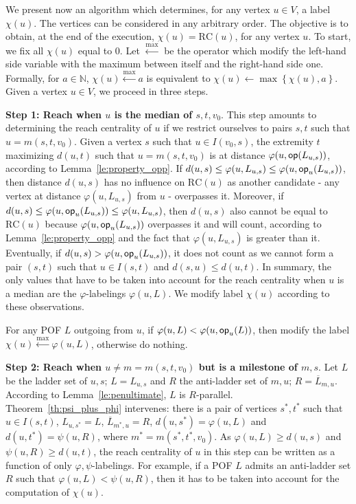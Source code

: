 \documentclass{article}
\newcommand{\set}[1]{\left\{ #1 \right\}}
\newcommand{\opp}{\mbox{\textsf{op}}}
\newcommand{\rc}{\mbox{RC}}
\begin{document}
We present now an algorithm which determines, for any vertex $u \in V$, a label $\chi(u)$. The vertices can be considered in any arbitrary order. The objective is to obtain, at the end of the execution, $\chi(u) = \rc(u)$, for any vertex $u$. To start, we fix all $\chi(u)$ equal to 0. Let $\xleftarrow{\max}$ be the operator which modify the left-hand side variable with the maximum between itself and the right-hand side one. Formally, for $a \in \mathbb{N}$, $\chi(u) \xleftarrow{\max} a$ is equivalent to $\chi(u) \leftarrow \max \set{\chi(u),a}$. Given a vertex $u \in V$, we proceed in three steps.

\textbf{Step 1: Reach when $u$ is the median of $s,t,v_0$}. This step amounts to determining the reach centrality of $u$ if we restrict ourselves to pairs $s,t$ such that $u = m(s,t,v_0)$. Given a vertex $s$ such that $u \in I(v_0,s)$, the extremity $t$ maximizing $d(u,t)$ such that $u = m(s,t,v_0)$ is at distance $\varphi(u,\opp(L_{u,s}))$, according to Lemma~\ref{le:property_opp}. If $d(u,s) \le \varphi(u,L_{u,s}) \le \varphi(u,\opp_u(L_{u,s}))$, then distance $d(u,s)$ has no influence on $\rc(u)$ as another candidate - any vertex at distance $\varphi(u,L_{u,s})$ from $u$ - overpasses it. Moreover, if $d(u,s) \le \varphi(u,\opp_u(L_{u,s})) \le \varphi(u,L_{u,s})$, then $d(u,s)$ also cannot be equal to $\rc(u)$ because $\varphi(u,\opp_u(L_{u,s}))$ overpasses it and will count, according to Lemma~\ref{le:property_opp} and the fact that $\varphi(u,L_{u,s})$ is greater than it. Eventually, if $d(u,s) > \varphi(u,\opp_u(L_{u,s}))$, it does not count as we cannot form a pair $(s,t)$ such that $u\in I(s,t)$ and $d(s,u) \le d(u,t)$. In summary, the only values that have to be taken into account for the reach centrality when $u$ is a median are the $\varphi$-labelings $\varphi(u,L)$. We modify label $\chi(u)$ according to these observations.

For any POF $L$ outgoing from $u$, if $\varphi(u,L) < \varphi(u,\opp_u(L))$, then modify the label $\chi(u) \xleftarrow{\max} \varphi(u,L)$, otherwise do nothing.

\textbf{Step 2: Reach when $u\neq m=m(s,t,v_0)$ but is a milestone of $m,s$}. Let $L$ be the ladder set of $u,s$; $L = L_{u,s}$ and $R$ the anti-ladder set of $m,u$; $R = \overline{L}_{m,u}$. According to Lemma~\ref{le:penultimate}, $L$ is $R$-parallel. Theorem~\ref{th:psi_plus_phi} intervenes: there is a pair of vertices $s^*,t^*$ such that $u \in I(s,t)$, $L_{u,s^*} = L$, $\overline{L}_{m^*,u} = R$, $d(u,s^*) = \varphi(u,L)$ and $d(u,t^*) = \psi(u,R)$, where $m^* = m(s^*,t^*,v_0)$. As $\varphi(u,L) \ge d(u,s)$ and $\psi(u,R) \ge d(u,t)$, the  reach centrality of $u$ in this step can be written as a function of only  $\varphi,\psi$-labelings. For example, if a POF $L$ admits an anti-ladder set $R$ such that $\varphi(u,L) < \psi(u,R)$, then it has to be taken into account for the computation of $\chi(u)$.
\end{document}
